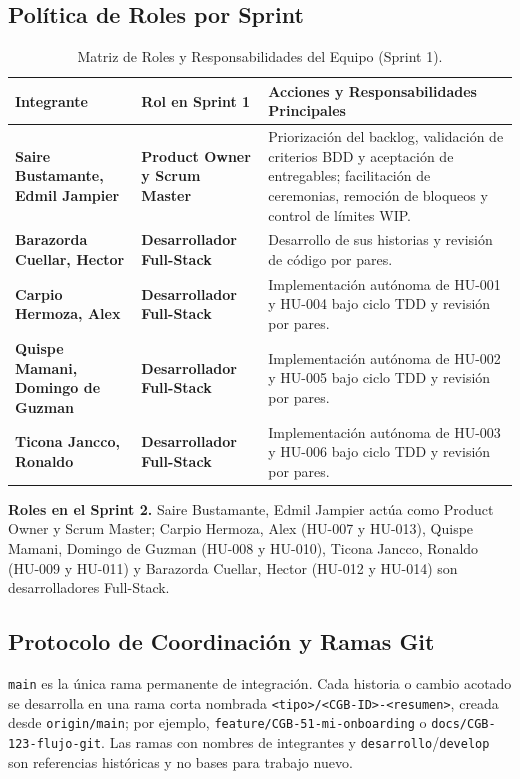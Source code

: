 \documentclass[11pt,a4paper]{article}
\begin{document}
\subsection{Política de Roles por Sprint}
\begin{table}[H]
\centering
\scriptsize
\renewcommand{\arraystretch}{1.2}
\begin{tabularx}{\linewidth}{|>{\raggedright\arraybackslash}p{4.0cm}|>{\raggedright\arraybackslash}p{3.2cm}|>{\raggedright\arraybackslash}X|}
\hline
\rowcolor{gray!15}
\textbf{Integrante} & \textbf{Rol en Sprint 1} & \textbf{Acciones y Responsabilidades Principales} \\
\hline
\textbf{Saire Bustamante, Edmil Jampier} & \textbf{Product Owner y Scrum Master} & Priorización del backlog, validación de criterios BDD y aceptación de entregables; facilitación de ceremonias, remoción de bloqueos y control de límites WIP. \\
\hline
\textbf{Barazorda Cuellar, Hector} & \textbf{Desarrollador Full-Stack} & Desarrollo de sus historias y revisión de código por pares. \\
\hline
\textbf{Carpio Hermoza, Alex} & \textbf{Desarrollador Full-Stack} & Implementación autónoma de HU-001 y HU-004 bajo ciclo TDD y revisión por pares. \\
\hline
\textbf{Quispe Mamani, Domingo de Guzman} & \textbf{Desarrollador Full-Stack} & Implementación autónoma de HU-002 y HU-005 bajo ciclo TDD y revisión por pares. \\
\hline
\textbf{Ticona Jancco, Ronaldo} & \textbf{Desarrollador Full-Stack} & Implementación autónoma de HU-003 y HU-006 bajo ciclo TDD y revisión por pares. \\
\hline
\end{tabularx}
\caption{Matriz de Roles y Responsabilidades del Equipo (Sprint 1).}
\end{table}

\textbf{Roles en el Sprint 2.} Saire Bustamante, Edmil Jampier actúa como Product Owner y Scrum Master; Carpio Hermoza, Alex (HU-007 y HU-013), Quispe Mamani, Domingo de Guzman (HU-008 y HU-010), Ticona Jancco, Ronaldo (HU-009 y HU-011) y Barazorda Cuellar, Hector (HU-012 y HU-014) son desarrolladores Full-Stack.

\subsection{Protocolo de Coordinación y Ramas Git}
\texttt{main} es la única rama permanente de integración. Cada historia o cambio acotado se desarrolla en una rama corta nombrada \texttt{<tipo>/<CGB-ID>-<resumen>}, creada desde \texttt{origin/main}; por ejemplo, \texttt{feature/CGB-51-mi-onboarding} o \texttt{docs/CGB-123-flujo-git}. Las ramas con nombres de integrantes y \texttt{desarrollo}/\texttt{develop} son referencias históricas y no bases para trabajo nuevo.
\end{document}
